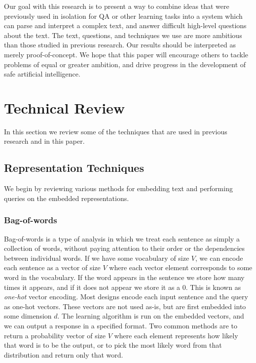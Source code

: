 \documentclass[pageno]{jpaper}
\begin{document}
Our goal with this research is to present a way to combine ideas that were
previously used in isolation for QA or other learning tasks into a system which
can parse and interpret a complex text, and answer difficult high-level
questions about the text. The text, questions, and techniques we use are more
ambitious than those studied in previous research. Our results should be
interpreted as merely proof-of-concept. We hope that this paper will encourage
others to tackle problems of equal or greater ambition, and drive progress in
the development of safe artificial intelligence.

\section{Technical Review}
\label{Technical Review}

In this section we review some of the techniques that are used in previous
research and in this paper.

\subsection{Representation Techniques}
\label{Representation Techniques}

We begin by reviewing various methods for embedding text and performing queries
on the embedded representations. \\

\subsubsection{Bag-of-words}
\label{Bag-of-words}

Bag-of-words is a type of analysis in which we treat each sentence as simply a
collection of words, without paying attention to their order or the dependencies
between individual words. If we have some vocabulary of size $V$, we can encode
each sentence as a vector of size $V$ where each vector element corresponds to
some word in the vocabulary. If the word appears in the sentence we store how
many times it appears, and if it does not appear we store it as a 0. This is
known as \textit{one-hot} vector encoding. Most designs encode each input
sentence and the query as one-hot vectors. These vectors are not used as-is, but
are first embedded into some dimension $d$. The learning algorithm is run on the
embedded vectors, and we can output a response in a specified format. Two common
methods are to return a probability vector of size $V$ where each element
represents how likely that word is to be the output, or to pick the most likely
word from that distribution and return only that word. \\
\end{document}
